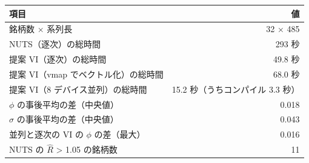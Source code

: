 \begin{tabular}{lr}
\toprule
項目 & 値 \\
\midrule
銘柄数 × 系列長 & 32 × 485 \\
NUTS（逐次）の総時間 & 293 秒 \\
提案 VI（逐次）の総時間 & 49.8 秒 \\
提案 VI（vmap でベクトル化）の総時間 & 68.0 秒 \\
提案 VI（8 デバイス並列）の総時間 & 15.2 秒（うちコンパイル 3.3 秒） \\
$\phi$ の事後平均の差（中央値） & 0.018 \\
$\sigma$ の事後平均の差（中央値） & 0.043 \\
並列と逐次の VI の $\phi$ の差（最大） & 0.016 \\
NUTS の $\hat R$ > 1.05 の銘柄数 & 11 \\
\bottomrule
\end{tabular}
